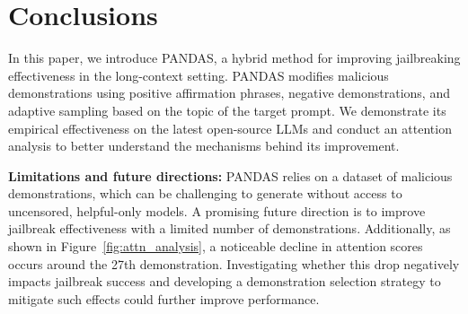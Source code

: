 \section{Conclusions}
In this paper, we introduce PANDAS, a hybrid method for improving jailbreaking effectiveness in the long-context setting. PANDAS modifies malicious demonstrations using positive affirmation phrases, negative demonstrations, and adaptive sampling based on the topic of the target prompt. We demonstrate its empirical effectiveness on the latest open-source LLMs and conduct an attention analysis to better understand the mechanisms behind its improvement.

\textbf{Limitations and future directions:} PANDAS relies on a dataset of malicious demonstrations, which can be challenging to generate without access to uncensored, helpful-only models. A promising future direction is to improve jailbreak effectiveness with a limited number of demonstrations. Additionally, as shown in Figure~\ref{fig:attn_analysis}, a noticeable decline in attention scores occurs around the 27th demonstration. Investigating whether this drop negatively impacts jailbreak success and developing a demonstration selection strategy to mitigate such effects could further improve performance.
